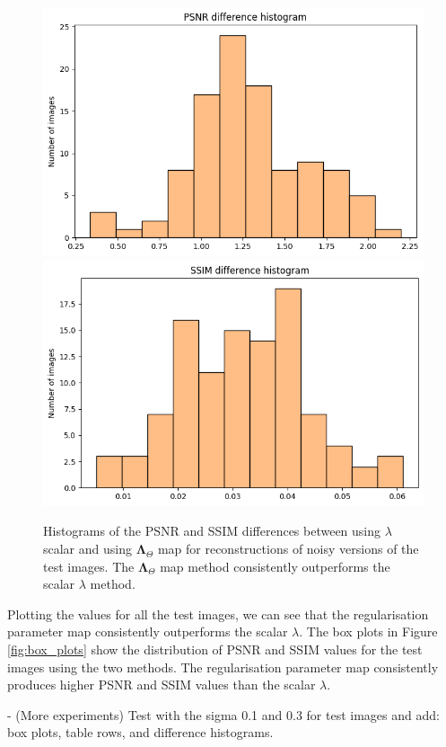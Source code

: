 \documentclass[12pt]{article}
\begin{document}
\begin{figure}[H]
  \centering
  \includegraphics[width=0.48\linewidth]{images//chest_xray/hist_psnr_diff.png}
  \includegraphics[width=0.48\linewidth]{images//chest_xray/hist_ssim_diff.png}
  \caption{Histograms of the PSNR and SSIM differences between using $\lambda$ scalar and using $\mathbf{\Lambda}_{\Theta}$ map for
  reconstructions of noisy versions of the test images. 
  The $\mathbf{\Lambda}_{\Theta}$ map method consistently outperforms the scalar $\lambda$ method.
  }
  \label{fig:hist_diff}
\end{figure}

Plotting the values for all the test images, we can see that the regularisation parameter map consistently outperforms the scalar $\lambda$.
The box plots in Figure \ref{fig:box_plots} show the distribution of PSNR and SSIM values for the test images
using the two methods.
The regularisation parameter map consistently produces higher PSNR and SSIM values than the scalar $\lambda$.






- (More experiments) Test with the sigma 0.1 and 0.3 for test images and add: box plots, table rows, and difference histograms.
\end{document}
